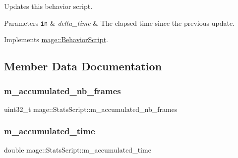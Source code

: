 Updates this behavior script.


\begin{DoxyParams}[1]{Parameters}
\mbox{\tt in}  & {\em delta\+\_\+time} & The elapsed time since the previous update. \\
\hline
\end{DoxyParams}


Implements \hyperlink{classmage_1_1_behavior_script_a905b6c83640cb91d19fecab3435f6feb}{mage\+::\+Behavior\+Script}.



\subsection{Member Data Documentation}
\hypertarget{classmage_1_1_stats_script_ac12aaf08707f8de8d88391bcc7f81c53}{}\label{classmage_1_1_stats_script_ac12aaf08707f8de8d88391bcc7f81c53} 
\subsubsection{\texorpdfstring{m\+\_\+accumulated\+\_\+nb\+\_\+frames}{m\_accumulated\_nb\_frames}}
{\footnotesize\ttfamily uint32\+\_\+t mage\+::\+Stats\+Script\+::m\+\_\+accumulated\+\_\+nb\+\_\+frames\hspace{0.3cm}{\ttfamily [private]}}

\hypertarget{classmage_1_1_stats_script_a55cb25f27b2354983d4e68cb1d4c8fcf}{}\label{classmage_1_1_stats_script_a55cb25f27b2354983d4e68cb1d4c8fcf} 
\subsubsection{\texorpdfstring{m\+\_\+accumulated\+\_\+time}{m\_accumulated\_time}}
{\footnotesize\ttfamily double mage\+::\+Stats\+Script\+::m\+\_\+accumulated\+\_\+time\hspace{0.3cm}{\ttfamily [private]}}

\hypertarget{classmage_1_1_stats_script_ae7dd506d04a4512ae103a1a9c2f9f206}{}\label{classmage_1_1_stats_script_ae7dd506d04a4512ae103a1a9c2f9f206} 
